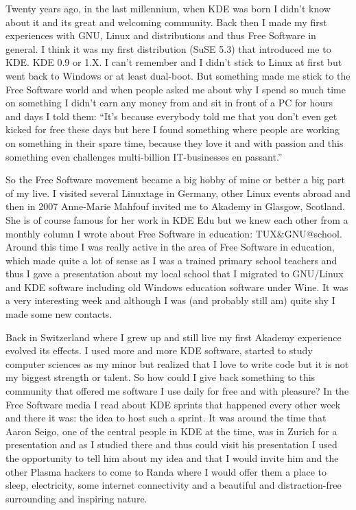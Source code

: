 

\noindent{}Twenty years ago, in the last millennium, when KDE was born I didn't know about it and its great and welcoming community. Back then I made my first experiences with GNU, Linux and distributions and thus Free Software in general. I think it was my first distribution (SuSE 5.3) that introduced me to KDE. KDE 0.9 or 1.X. I can't remember and I didn't stick to Linux at first but went back to Windows or at least dual-boot. But something made me stick to the Free Software world and when people asked me about why I spend so much time on something I didn't earn any money from and sit in front of a PC for hours and days I told them:
``It's because everybody told me that you don't even get kicked for free these days but here I found something where people are working on something in their spare time, because they love it and with passion and this something even challenges multi-billion IT-businesses en passant.''

So the Free Software movement became a big hobby of mine or better a big part of my live. I visited several Linuxtage in Germany, other Linux events abroad and then in 2007 Anne-Marie Mahfouf invited me to Akademy in Glasgow, Scotland. She is of course famous for her work in KDE Edu but we knew each other from a monthly column I wrote about Free Software in education: TUX\&GNU@school. Around this time I was really active in the area of Free Software in education, which made quite a lot of sense as I was a trained primary school teachers and thus I gave a presentation about my local school that I migrated to GNU/Linux and KDE software including old Windows education software under Wine. It was a very interesting week and although I was (and probably still am) quite shy I made some new contacts.

Back in Switzerland where I grew up and still live my first Akademy experience evolved its effects. I used more and more KDE software, started to study computer sciences as my minor but realized that I love to write code but it is not my biggest strength or talent. So how could I give back something to this community that offered me software I use daily for free and with pleasure? In the Free Software media I read about KDE sprints that happened every other week and there it was: the idea to host such a sprint. It was around the time that Aaron Seigo, one of the central people in KDE at the time, was in Zurich for a presentation and as I studied there and thus could visit his presentation I used the opportunity to tell him about my idea and that I would invite him and the other Plasma hackers to come to Randa where I would offer them a place to sleep, electricity, some internet connectivity and a beautiful and distraction-free surrounding and inspiring nature.

